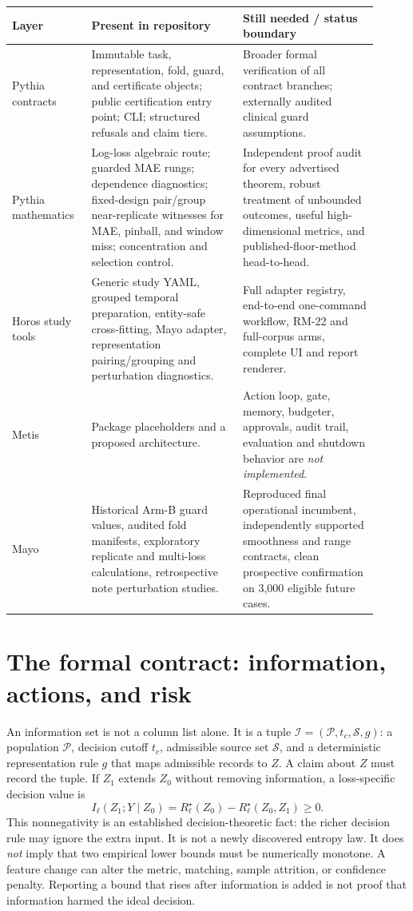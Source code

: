 \documentclass[11pt]{article}
\newcommand{\Rstar}{R^{\star}}
\begin{document}
\begin{longtable}{p{0.19\linewidth}p{0.38\linewidth}p{0.34\linewidth}}
\toprule
Layer & Present in repository & Still needed / status boundary\\
\midrule
\endhead
Pythia contracts & Immutable task, representation, fold, guard, and certificate objects; public certification entry point; CLI; structured refusals and claim tiers. & Broader formal verification of all contract branches; externally audited clinical guard assumptions.\\
Pythia mathematics & Log-loss algebraic route; guarded MAE rungs; dependence diagnostics; fixed-design pair/group near-replicate witnesses for MAE, pinball, and window miss; concentration and selection control. & Independent proof audit for every advertised theorem, robust treatment of unbounded outcomes, useful high-dimensional metrics, and published-floor-method head-to-head.\\
Horos study tools & Generic study YAML, grouped temporal preparation, entity-safe cross-fitting, Mayo adapter, representation pairing/grouping and perturbation diagnostics. & Full adapter registry, end-to-end one-command workflow, RM-22 and full-corpus arms, complete UI and report renderer.\\
Metis & Package placeholders and a proposed architecture. & Action loop, gate, memory, budgeter, approvals, audit trail, evaluation and shutdown behavior are \emph{not implemented}.\\
Mayo & Historical Arm-B guard values, audited fold manifests, exploratory replicate and multi-loss calculations, retrospective note perturbation studies. & Reproduced final operational incumbent, independently supported smoothness and range contracts, clean prospective confirmation on 3,000 eligible future cases.\\
\bottomrule
\end{longtable}

\section{The formal contract: information, actions, and risk}
An information set is not a column list alone. It is a tuple $\mathcal I=(\mathcal P,t_c,\mathcal S,g)$: a population $\mathcal P$, decision cutoff $t_c$, admissible source set $\mathcal S$, and a deterministic representation rule $g$ that maps admissible records to $Z$. A claim about $Z$ must record the tuple. If $Z_1$ extends $Z_0$ without removing information, a loss-specific decision value is
\begin{equation}
I_{\ell}(Z_1;Y\mid Z_0)=\Rstar_{\ell}(Z_0)-\Rstar_{\ell}(Z_0,Z_1)\geq 0.
\end{equation}
This nonnegativity is an established decision-theoretic fact: the richer decision rule may ignore the extra input. It is not a newly discovered entropy law. It does \emph{not} imply that two empirical lower bounds must be numerically monotone. A feature change can alter the metric, matching, sample attrition, or confidence penalty. Reporting a bound that rises after information is added is not proof that information harmed the ideal decision.
\end{document}
